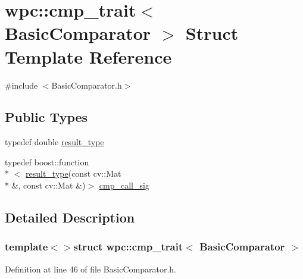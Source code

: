 \hypertarget{structwpc_1_1cmp__trait_3_01_basic_comparator_01_4}{\section{wpc\-:\-:cmp\-\_\-trait$<$ Basic\-Comparator $>$ Struct Template Reference}
\label{structwpc_1_1cmp__trait_3_01_basic_comparator_01_4}
}


{\ttfamily \#include $<$Basic\-Comparator.\-h$>$}

\subsection*{Public Types}
\begin{DoxyCompactItemize}
\item 
typedef double \hyperlink{structwpc_1_1cmp__trait_3_01_basic_comparator_01_4_a2154be1a27ddbf1add7bb47beb275c5a}{result\-\_\-type}
\item 
typedef boost\-::function\\*
$<$ \hyperlink{structwpc_1_1cmp__trait_3_01_basic_comparator_01_4_a2154be1a27ddbf1add7bb47beb275c5a}{result\-\_\-type}(const cv\-::\-Mat \\*
\&, const cv\-::\-Mat \&)$>$ \hyperlink{structwpc_1_1cmp__trait_3_01_basic_comparator_01_4_a9712f56416054a0f465550d39436a9b1}{cmp\-\_\-call\-\_\-sig}
\end{DoxyCompactItemize}


\subsection{Detailed Description}
\subsubsection*{template$<$$>$struct wpc\-::cmp\-\_\-trait$<$ Basic\-Comparator $>$}



Definition at line 46 of file Basic\-Comparator.\-h.



